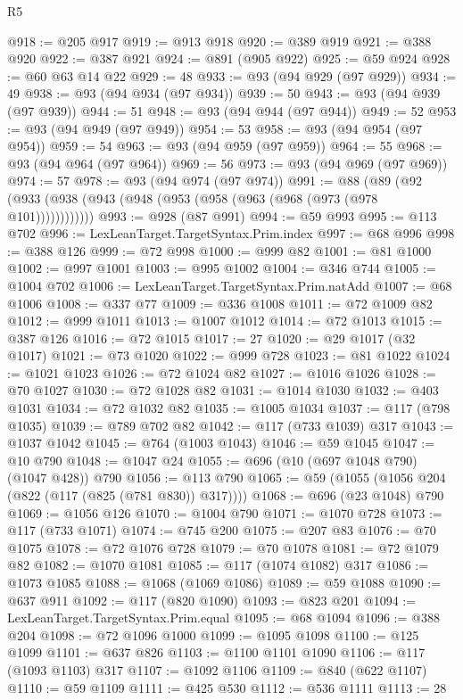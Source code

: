 \begin{lexlean}{R5}
\begin{coremodule}
@918 := @205 @917
@919 := @913 @918
@920 := @389 @919
@921 := @388 @920
@922 := @387 @921
@924 := @891 (@905 @922)
@925 := @59 @924
@928 := @60 @63 @14 @22
@929 := 48
@933 := @93 (@94 @929 (@97 @929))
@934 := 49
@938 := @93 (@94 @934 (@97 @934))
@939 := 50
@943 := @93 (@94 @939 (@97 @939))
@944 := 51
@948 := @93 (@94 @944 (@97 @944))
@949 := 52
@953 := @93 (@94 @949 (@97 @949))
@954 := 53
@958 := @93 (@94 @954 (@97 @954))
@959 := 54
@963 := @93 (@94 @959 (@97 @959))
@964 := 55
@968 := @93 (@94 @964 (@97 @964))
@969 := 56
@973 := @93 (@94 @969 (@97 @969))
@974 := 57
@978 := @93 (@94 @974 (@97 @974))
@991 := @88 (@89 (@92 (@933 (@938 (@943 (@948 (@953 (@958 (@963 (@968 (@973 (@978 @101))))))))))))
@993 := @928 (@87 @991)
@994 := @59 @993
@995 := @113 @702
@996 := LexLeanTarget.TargetSyntax.Prim.index
@997 := @68 @996
@998 := @388 @126
@999 := @72 @998
@1000 := @999 @82
@1001 := @81 @1000
@1002 := @997 @1001
@1003 := @995 @1002
@1004 := @346 @744
@1005 := @1004 @702
@1006 := LexLeanTarget.TargetSyntax.Prim.natAdd
@1007 := @68 @1006
@1008 := @337 @77
@1009 := @336 @1008
@1011 := @72 @1009 @82
@1012 := @999 @1011
@1013 := @1007 @1012
@1014 := @72 @1013
@1015 := @387 @126
@1016 := @72 @1015
@1017 := 27
@1020 := @29 @1017 (@32 @1017)
@1021 := @73 @1020
@1022 := @999 @728
@1023 := @81 @1022
@1024 := @1021 @1023
@1026 := @72 @1024 @82
@1027 := @1016 @1026
@1028 := @70 @1027
@1030 := @72 @1028 @82
@1031 := @1014 @1030
@1032 := @403 @1031
@1034 := @72 @1032 @82
@1035 := @1005 @1034
@1037 := @117 (@798 @1035)
@1039 := @789 @702 @82
@1042 := @117 (@733 @1039) @317
@1043 := @1037 @1042
@1045 := @764 (@1003 @1043)
@1046 := @59 @1045
@1047 := @10 @790
@1048 := @1047 @24
@1055 := @696 (@10 (@697 @1048 @790) (@1047 @428)) @790
@1056 := @113 @790
@1065 := @59 (@1055 (@1056 @204 (@822 (@117 (@825 (@781 @830)) @317))))
@1068 := @696 (@23 @1048) @790
@1069 := @1056 @126
@1070 := @1004 @790
@1071 := @1070 @728
@1073 := @117 (@733 @1071)
@1074 := @745 @200
@1075 := @207 @83
@1076 := @70 @1075
@1078 := @72 @1076 @728
@1079 := @70 @1078
@1081 := @72 @1079 @82
@1082 := @1070 @1081
@1085 := @117 (@1074 @1082) @317
@1086 := @1073 @1085
@1088 := @1068 (@1069 @1086)
@1089 := @59 @1088
@1090 := @637 @911
@1092 := @117 (@820 @1090)
@1093 := @823 @201
@1094 := LexLeanTarget.TargetSyntax.Prim.equal
@1095 := @68 @1094
@1096 := @388 @204
@1098 := @72 @1096 @1000
@1099 := @1095 @1098
@1100 := @125 @1099
@1101 := @637 @826
@1103 := @1100 @1101 @1090
@1106 := @117 (@1093 @1103) @317
@1107 := @1092 @1106
@1109 := @840 (@622 @1107)
@1110 := @59 @1109
@1111 := @425 @530
@1112 := @536 @1111
@1113 := 28

\end{coremodule}
\end{lexlean}
